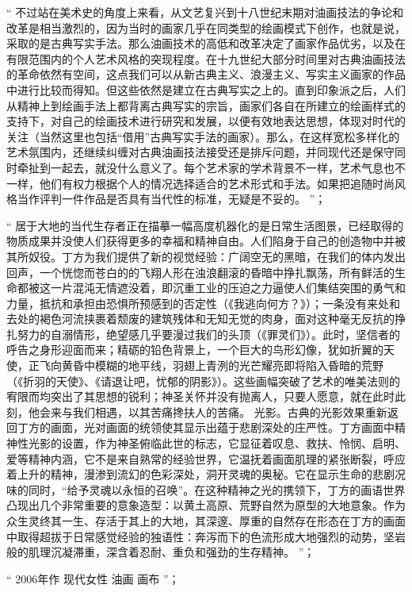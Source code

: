 \documentclass[master,oneside]{zjuthesis}
\begin{document}
“ 不过站在美术史的角度上来看，从文艺复兴到十八世纪末期对油画技法的争论和改革是相当激烈的，因为当时的画家几乎在同类型的绘画模式下创作，也就是说，采取的是古典写实手法。那么油画技术的高低和改革决定了画家作品优劣，以及在有限范围内的个人艺术风格的突现程度。在十九世纪大部分时间里对古典油画技法的革命依然有空间，这点我们可以从新古典主义、浪漫主义、写实主义画家的作品中进行比较而得知。但这些依然是建立在古典写实之上的。直到印象派之后，人们从精神上到绘画手法上都背离古典写实的宗旨，画家们各自在所建立的绘画样式的支持下，对自己的绘画技术进行研究和发展，以便有效地表达思想，体现对时代的关注（当然这里也包括“借用”古典写实手法的画家）。那么，在这样宽松多样化的艺术氛围内，还继续纠缠对古典油画技法接受还是排斥问题，并同现代还是保守同时牵扯到一起去，就没什么意义了。每个艺术家的学术背景不一样，艺术气息也不一样，他们有权力根据个人的情况选择适合的艺术形式和手法。如果把追随时尚风格当作评判一件作品是否具有当代性的标准，无疑是不妥的。 ”；

“ 居于大地的当代生存者正在描摹一幅高度机器化的是日常生活图景，已经取得的物质成果并没使人们获得更多的幸福和精神自由。人们陷身于自己的创造物中并被其所奴役。丁方为我们提供了新的视觉经验：广阔空无的黑暗，在我们的体内发出回声，一个恍惚而苍白的的飞翔人形在浊浪翻滚的昏暗中挣扎飘荡，所有鲜活的生命都被这一片混沌无情遮没着，即沉重工业的压迫之力逼使人们集结突围的勇气和力量，抵抗和承担由恐惧所预感到的否定性（《我逃向何方？》）；一条没有来处和去处的褐色河流挟裹着颓废的建筑残体和无知无觉的肉身，面对这种毫无反抗的挣扎努力的自溺情形，绝望感几乎要漫过我们的头顶（《罪灵们》）。此时，坚信者的呼告之身形迎面而来；精砺的铅色背景上，一个巨大的鸟形幻像，犹如折翼的天使，正飞向黄昏中模糊的地平线，羽翅上青洌的光芒耀亮即将陷入昏暗的荒野（《折羽的天使》、《请退让吧，忧郁的阴影》）。这些画幅突破了艺术的唯美法则的宥限而均突出了其思想的锐利；神圣关怀并没有抛离人，只要人愿意，就在此时此刻，他会来与我们相遇，以其苦痛搀扶人的苦痛。 光影。古典的光影效果重新返回丁方的画面，光对画面的统领使其显示出蕴于悲剧深处的庄严性。丁方画面中精神性光影的设置，作为神圣俯临此世的标志，它显征着叹息、救扶、怜悯、启明、爱等精神内涵，它不是来自熟常的经验世界，它温抚着画面肌理的紧张断裂，呼应着上升的精神，漫渗到流幻的色彩深处，洞开灵魂的奥秘。它在显示生命的悲剧况味的同时，“给予灵魂以永恒的召唤”。在这种精神之光的携领下，丁方的画语世界凸现出几个非常重要的意象造型：以黄土高原、荒野自然为原型的大地意象。作为众生灵终其一生、存活于其上的大地，其深邃、厚重的自然存在形态在丁方的画面中取得超拔于日常感觉经验的独语性：奔泻而下的色流形成大地强烈的动势，坚岩般的肌理沉凝滞重，深含着忍耐、重负和强劲的生存精神。 ”；

“ 2006年作 现代女性 油画 画布 ”；
\end{document}

